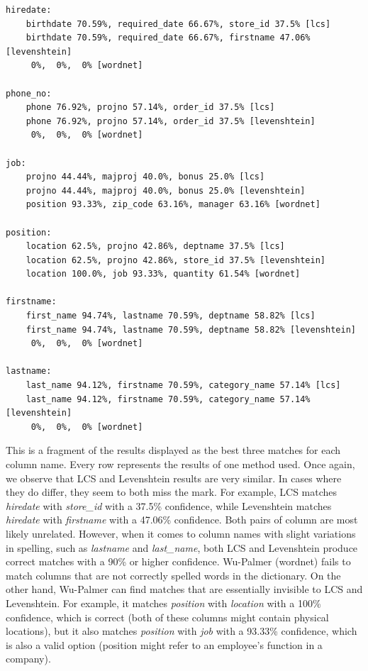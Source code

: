 \begin{verbatim}
hiredate:
	birthdate 70.59%, required_date 66.67%, store_id 37.5% [lcs]
	birthdate 70.59%, required_date 66.67%, firstname 47.06% [levenshtein]
	 0%,  0%,  0% [wordnet]

phone_no:
	phone 76.92%, projno 57.14%, order_id 37.5% [lcs]
	phone 76.92%, projno 57.14%, order_id 37.5% [levenshtein]
	 0%,  0%,  0% [wordnet]

job:
	projno 44.44%, majproj 40.0%, bonus 25.0% [lcs]
	projno 44.44%, majproj 40.0%, bonus 25.0% [levenshtein]
	position 93.33%, zip_code 63.16%, manager 63.16% [wordnet]

position:
	location 62.5%, projno 42.86%, deptname 37.5% [lcs]
	location 62.5%, projno 42.86%, store_id 37.5% [levenshtein]
	location 100.0%, job 93.33%, quantity 61.54% [wordnet]

firstname:
	first_name 94.74%, lastname 70.59%, deptname 58.82% [lcs]
	first_name 94.74%, lastname 70.59%, deptname 58.82% [levenshtein]
	 0%,  0%,  0% [wordnet]

lastname:
	last_name 94.12%, firstname 70.59%, category_name 57.14% [lcs]
	last_name 94.12%, firstname 70.59%, category_name 57.14% [levenshtein]
	 0%,  0%,  0% [wordnet]
\end{verbatim}

This is a fragment of the results displayed as the best three matches for each column name.
Every row represents the results of one method used.
Once again, we observe that LCS and Levenshtein results are very similar.
In cases where they do differ, they seem to both miss the mark.
For example, LCS matches \textit{hiredate} with \textit{store\_id} with a 37.5\% confidence, while Levenshtein matches
\textit{hiredate} with \textit{firstname} with a 47.06\% confidence.
Both pairs of column are most likely unrelated.
However, when it comes to column names with slight variations in spelling, such as \textit{lastname} and \textit{last\_name},
both LCS and Levenshtein produce correct matches with a 90\% or higher confidence.
Wu-Palmer (wordnet) fails to match columns that are not correctly spelled words in the dictionary.
On the other hand, Wu-Palmer can find matches that are essentially invisible to LCS and Levenshtein.
For example, it matches \textit{position} with \textit{location} with a 100\% confidence, which is correct (both of these
columns might contain physical locations), but it also matches \textit{position} with \textit{job} with a 93.33\% confidence,
which is also a valid option (position might refer to an employee's function in a company).

